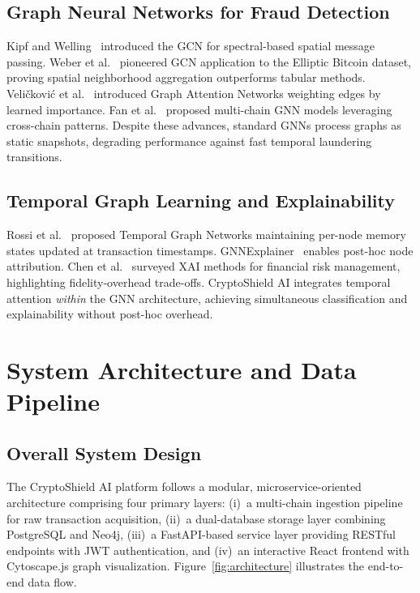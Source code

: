 \documentclass[conference]{IEEEtran}
\begin{document}
\subsection{Graph Neural Networks for Fraud Detection}
Kipf and Welling~\cite{kipf2017gcn} introduced the GCN for spectral-based spatial message passing. Weber et al.~\cite{weber2019aml} pioneered GCN application to the Elliptic Bitcoin dataset, proving spatial neighborhood aggregation outperforms tabular methods. Veli\v{c}kovi\'{c} et al.~\cite{velickovic2018gat} introduced Graph Attention Networks weighting edges by learned importance. Fan et al.~\cite{fan2022multichain} proposed multi-chain GNN models leveraging cross-chain patterns. Despite these advances, standard GNNs process graphs as static snapshots, degrading performance against fast temporal laundering transitions.

\subsection{Temporal Graph Learning and Explainability}
Rossi et al.~\cite{rossi2020tgn} proposed Temporal Graph Networks maintaining per-node memory states updated at transaction timestamps. GNNExplainer~\cite{ying2019gnnexplainer} enables post-hoc node attribution. Chen et al.~\cite{chen2022xai} surveyed XAI methods for financial risk management, highlighting fidelity-overhead trade-offs. CryptoShield AI integrates temporal attention \textit{within} the GNN architecture, achieving simultaneous classification and explainability without post-hoc overhead.

\section{System Architecture and Data Pipeline}
\label{sec:architecture}

\subsection{Overall System Design}
The CryptoShield AI platform follows a modular, microservice-oriented architecture comprising four primary layers: (i)~a multi-chain ingestion pipeline for raw transaction acquisition, (ii)~a dual-database storage layer combining PostgreSQL and Neo4j, (iii)~a FastAPI-based service layer providing RESTful endpoints with JWT authentication, and (iv)~an interactive React frontend with Cytoscape.js graph visualization. Figure~\ref{fig:architecture} illustrates the end-to-end data flow.
\end{document}
